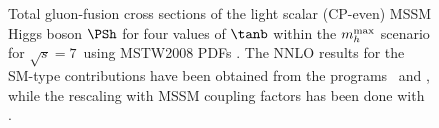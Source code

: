 \begin{figure}[htb]
\caption{\label{YRHXS_MSSM_neutral_fig2} Total gluon-fusion cross
sections of the light scalar (CP-even) MSSM Higgs boson $\PSh$ for four values of
$\tanb$ within the $m_h^{\rm max}$ scenario for $\sqrt{s}=7$\UTeV\ using
MSTW2008 PDFs \cite{Martin:2009iq,Martin:2009bu}. The NNLO results for
the SM-type contributions have been obtained from the programs
\HIGLU~and \gghnnlo, while the rescaling with MSSM coupling factors has
been done with \FeynHiggs.}

\end{figure}
